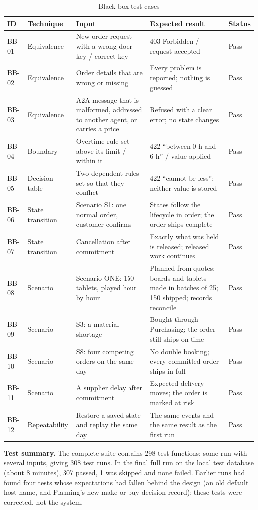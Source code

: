 \begin{table}[h]
\centering
\small
\renewcommand{\arraystretch}{1.2}
\begin{tabular}{|p{}|p{}|p{}|p{}|p{}|}
\hline
\textbf{ID} & \textbf{Technique} & \textbf{Input} & \textbf{Expected result} & \textbf{Status} \\ \hline
BB-01 & Equivalence & New order request with a wrong door key / correct key
      & 403 Forbidden / request accepted & Pass \\ \hline
BB-02 & Equivalence & Order details that are wrong or missing
      & Every problem is reported; nothing is guessed & Pass \\ \hline
BB-03 & Equivalence & A2A message that is malformed, addressed to another agent, or carries a price
      & Refused with a clear error; no state changes & Pass \\ \hline
BB-04 & Boundary & Overtime rule set above its limit / within it
      & 422 ``between 0 h and 6 h'' / value applied & Pass \\ \hline
BB-05 & Decision table & Two dependent rules set so that they conflict
      & 422 ``cannot be less''; neither value is stored & Pass \\ \hline
BB-06 & State transition & Scenario S1: one normal order, customer confirms
      & States follow the lifecycle in order; the order ships complete & Pass \\ \hline
BB-07 & State transition & Cancellation after commitment
      & Exactly what was held is released; released work continues & Pass \\ \hline
BB-08 & Scenario & Scenario ONE: 150 tablets, played hour by hour
      & Planned from quotes; boards and tablets made in batches of 25; 150 shipped; records reconcile & Pass \\ \hline
BB-09 & Scenario & S3: a material shortage
      & Bought through Purchasing; the order still ships on time & Pass \\ \hline
BB-10 & Scenario & S8: four competing orders on the same day
      & No double booking; every committed order ships in full & Pass \\ \hline
BB-11 & Scenario & A supplier delay after commitment
      & Expected delivery moves; the order is marked at risk & Pass \\ \hline
BB-12 & Repeatability & Restore a saved state and replay the same day
      & The same events and the same result as the first run & Pass \\ \hline
\end{tabular}
\caption{Black-box test cases}
\label{tab:bb-cases}
\end{table}

\noindent\textbf{Test summary.} The complete suite contains 298 test functions; some run with several inputs, giving
308 test runs. In the final full run on the local test database (about 8 minutes), 307 passed, 1 was skipped and none
failed. Earlier runs had found four tests whose expectations had fallen behind the design (an old default host name, and
Planning's new make-or-buy decision record); these tests were corrected, not the system.
